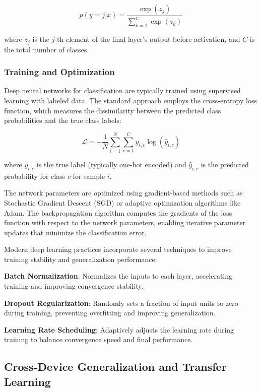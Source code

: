 \begin{equation}
p(y = j | x) = \frac{\exp(z_j)}{\sum_{k=1}^{C} \exp(z_k)}
\end{equation}

where $z_j$ is the $j$-th element of the final layer's output before activation, and $C$ is the total number of classes.

\subsubsection{Training and Optimization}

Deep neural networks for classification are typically trained using supervised learning with labeled data. The standard approach employs the cross-entropy loss function, which measures the
dissimilarity between the predicted class probabilities and the true class labels:

\begin{equation}
\mathcal{L} = -\frac{1}{N} \sum_{i=1}^{N} \sum_{c=1}^{C} y_{i,c} \log(\hat{y}_{i,c})
\end{equation}

where $y_{i,c}$ is the true label (typically one-hot encoded) and $\hat{y}_{i,c}$ is the predicted probability for class $c$ for sample $i$.

The network parameters are optimized using gradient-based methods such as Stochastic Gradient Descent (SGD) or adaptive optimization algorithms like Adam. The backpropagation algorithm computes
the gradients of the loss function with respect to the network parameters, enabling iterative parameter updates that minimize the classification error.

Modern deep learning practices incorporate several techniques to improve training stability and generalization performance:

\textbf{Batch Normalization}: Normalizes the inputs to each layer, accelerating training and improving convergence stability.

\textbf{Dropout Regularization}: Randomly sets a fraction of input units to zero during training, preventing overfitting and improving generalization.

\textbf{Learning Rate Scheduling}: Adaptively adjusts the learning rate during training to balance convergence speed and final performance.

\subsection{Cross-Device Generalization and Transfer Learning}

